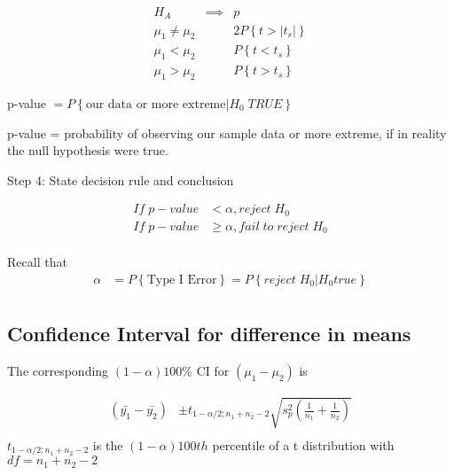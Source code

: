 \documentclass[10pt]{article}
\newcommand{\define}[1]{\colorbox{Thistle2}{#1}}
\newcommand{\mean}[1]{\mu_{#1}}
\newcommand{\svar}[1]{s^2_{#1}} %
\newcommand{\prob}[1]{P\left\{#1\right\}}
\begin{document}
\begin{multicols}{3}
    \begin{align*}
        H_A                    & \implies & p                 \\
        \mean{1} \neq \mean{2} &          & 2\prob{t > |t_s|} \\
        \mean{1} < \mean{2}    &          & \prob{t < t_s}    \\
        \mean{1} > \mean{2}    &          & \prob{t > t_s}
    \end{align*}

    p-value $= \prob{\text{our data or more extreme} | H_0 \; TRUE}$

    \define{p-value} = probability of observing our sample data or more extreme, if in reality the null hypothesis were true.

    Step 4: State decision rule and conclusion

    \begin{align*}
        If \; p-value & < \alpha, reject \; H_0                \\
        If \; p-value & \geq \alpha, fail \;to\; reject \; H_0 \\
    \end{align*}

    Recall that
    \begin{align*}
        \alpha & = \prob{\text{Type I Error}} = \prob{reject \; H_0 | H_0 true} \\
    \end{align*}

    \subsection{Confidence Interval for difference in means}

    The corresponding $(1-\alpha)100\%$ CI for $(\mean{1} - \mean{2})$ is

    \begin{align*}
        (\bar{y_1} - \bar{y_2}) & \pm t_{1 - \alpha/2; n_1 + n_2 - 2} \sqrt{\svar{p}\left(\frac{1}{n_1} + \frac{1}{n_2}\right)} \\
    \end{align*}
    $t_{1 - \alpha/2; n_1 + n_2 - 2}$ is the $(1-\alpha)100th$ percentile of a t distribution with $df = n_1 + n_2 - 2$


\end{multicols}
\end{document}
